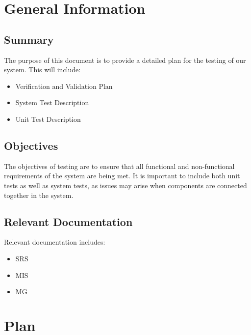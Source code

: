 \documentclass[12pt, titlepage]{article}
\begin{document}

\newpage


\section{General Information}

\subsection{Summary}

The purpose of this document is to provide a detailed plan for the testing of our system. This will include:
\begin{itemize}
  \item Verification and Validation Plan
  \item System Test Description
  \item Unit Test Description
\end{itemize}

\subsection{Objectives}

The objectives of testing are to ensure that all functional and non-functional requirements of the system are being met. It is important to include both unit tests as well as system tests, as issues may arise when components are connected together in the system. 

\subsection{Relevant Documentation}

Relevant documentation includes:
\begin{itemize}
  \item SRS
  \item MIS
  \item MG
\end{itemize}

\section{Plan}
\end{document}

